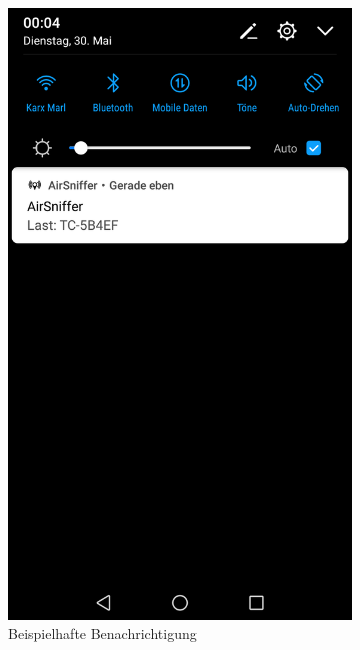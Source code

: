 \documentclass[11pt,a4paper]{article}
\begin{document}
\begin{figure}[htbp]
\begin{subfigure}[htbp]{0.26\textwidth}
        \includegraphics[width=\textwidth]{pics/screenshots/AirSniffer_Notification.png}
        \caption{Beispielhafte Benachrichtigung}
        \label{fig:AirSniffer_Notification}
    \end{subfigure}
    \begin{subfigure}[htbp]{0.26\textwidth}

\end{subfigure}
\end{figure}
\end{document}
